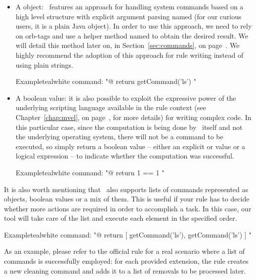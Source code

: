 \begin{description}
\begin{description}
\begin{itemize}[label={--}]
\item A  object: \arara\ features an approach for handling system commands based on a high level structure with explicit argument parsing named  (for our curious users, it is a plain Java object). In order to use this approach, we need to rely on \glspl{orb-tag} and use a helper method named  to obtain the desired result. We will detail this method later on, in Section~\ref{sec:commands}, on page~\pageref{sec:commands}. We highly recommend the adoption of this approach for rule writing instead of using plain strings.

\begin{codebox}{Example}{teal}{\icnote}{white}
command: "@{ return getCommand('ls') }"
\end{codebox}

\item A boolean value: it is also possible to exploit the expressive power of the underlying scripting language available in the rule context (see Chapter~\ref{chap:mvel}, on page~\pageref{chap:mvel}, for more details) for writing complex code. In this particular case, since the computation is being done by \arara\ itself and not the underlying operating system, there will not be a command to be executed, so simply return a boolean value -- either an explicit  or  value or a logical expression -- to indicate whether the computation was successful.

\begin{codebox}{Example}{teal}{\icnote}{white}
command: "@{ return 1 == 1 }"
\end{codebox}
\end{itemize}

It is also worth mentioning that \arara\ also supports lists of commands represented as  objects, boolean values or a mix of them. This is useful if your rule has to decide whether more actions are required in order to accomplish a task. In this case, our tool will take care of the list and execute each element in the specified order.

\begin{codebox}{Example}{teal}{\icnote}{white}
command: "@{ return [ getCommand('ls'), getCommand('ls') ] }"
\end{codebox}

As an example, please refer to the official  rule for a real scenario where a list of commands is successfully employed: for each provided extension, the rule creates a new cleaning command and adds it to a list of removals to be processed later.


\end{description}
\end{description}

